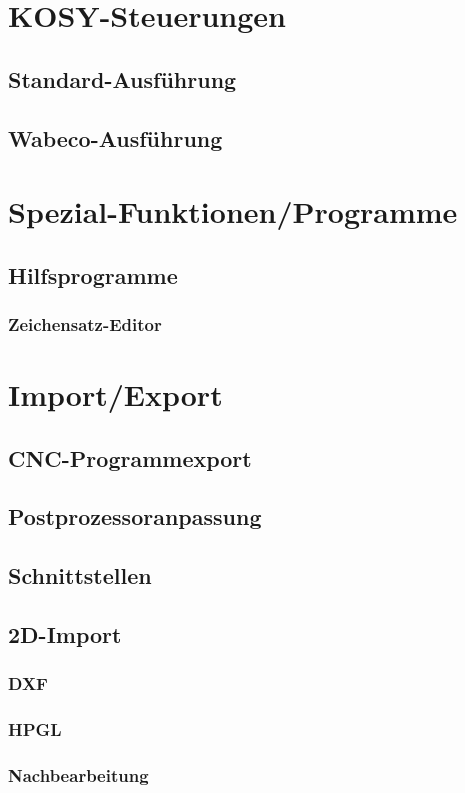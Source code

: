 \documentclass[14pt,a4paper]{book}
\begin{document}
\chapter{KOSY-Steuerungen} 
	\section{Standard-Ausführung} 
	\section{Wabeco-Ausführung} 

\chapter{Spezial-Funktionen/Programme} 
	\section{Hilfsprogramme} 
		\subsection{Zeichensatz-Editor} 

\chapter{Import/Export} 
	\section{CNC-Programmexport} 
	\section{Postprozessoranpassung} 
	\section{Schnittstellen} 
	\section{2D-Import} 
		\subsection{DXF}
		\subsection{HPGL} 
		\subsection{Nachbearbeitung} 
\end{document}
